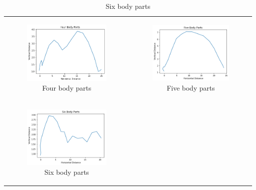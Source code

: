 \documentclass[12pt,oneside,listof=totoc,paper=a4,headings=small]{scrbook}
\begin{document}
{\begin{table}[ht]
\begin{tabular}{cc}
\newline
\begin{subfigure}{0.4\textwidth}\centering\includegraphics[width=0.75\columnwidth]{images/FourBodyParts.png}\caption{Four body parts}\label{fig:partstabc}\end{subfigure}&
\begin{subfigure}{0.4\textwidth}\centering\includegraphics[width=0.75\columnwidth]{images/FiveBodyParts.png}\caption{Five body parts}\label{fig:partstabd}\end{subfigure}\\
\newline
\begin{subfigure}{0.4\textwidth}\centering\includegraphics[width=0.75\columnwidth]{images/SixBodyParts.png}\caption{Six body parts}\label{fig:partstabe}\end{subfigure}&

\end{tabular}
\end{table}}
\end{document}
